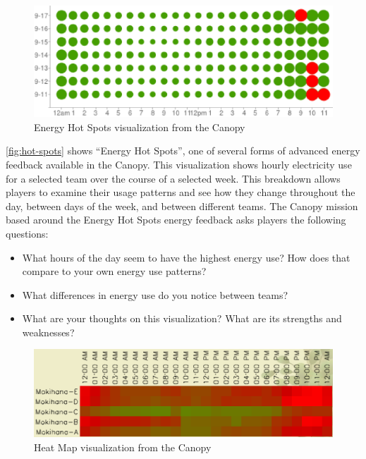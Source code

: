\documentclass[10pt, conference, compsocconf]{IEEEtran-old}
\begin{document}
\begin{figure}[!tb]
	\centering
	\includegraphics[width=\columnwidth]{hot-spots-crop2.eps}
	\caption{Energy Hot Spots visualization from the Canopy}
	\label{fig:hot-spots}
\end{figure}

\autoref{fig:hot-spots} shows ``Energy Hot Spots'', one of several forms of advanced energy feedback available in the Canopy. This visualization shows hourly electricity use for a selected team over the course of a selected week. This breakdown allows players to examine their usage patterns and see how they change throughout the day, between days of the week, and between different teams. The Canopy mission based around the Energy Hot Spots energy feedback asks players the following questions:

\begin{itemize}
	\item What hours of the day seem to have the highest energy use? How does that compare to your own energy use patterns?
	\item What differences in energy use do you notice between teams?
	\item What are your thoughts on this visualization? What are its strengths and weaknesses?
\end{itemize}

\begin{figure}[!tb]
	\centering
	\includegraphics[width=\columnwidth]{heat-map.eps}
	\caption{Heat Map visualization from the Canopy}
	\label{fig:heat-map}
\end{figure}
\end{document}
